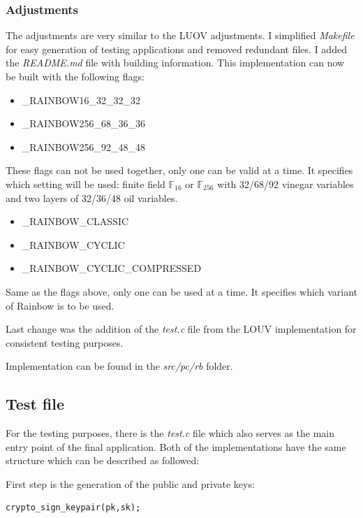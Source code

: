 \documentclass[thesis=M,english]{FITthesis}[2019/12/23]
\begin{document}
\subsubsection{Adjustments}
The adjustments are very similar to the LUOV adjustments. I simplified \textit{Makefile} for easy generation of testing applications and removed redundant files. I added the \textit{README.md} file with building information. This implementation can now be built with the following flags:

\begin{itemize}
\item	\_RAINBOW16\_32\_32\_32
\item	\_RAINBOW256\_68\_36\_36
\item	\_RAINBOW256\_92\_48\_48
\end{itemize}
These flags can not be used together, only one can be valid at a time. It specifies which setting will be used: finite field $\mathbb{F}_{16}$ or $\mathbb{F}_{256}$ with 32/68/92 vinegar variables and two layers of 32/36/48 oil variables.

\begin{itemize}
\item	\_RAINBOW\_CLASSIC
\item	\_RAINBOW\_CYCLIC
\item	\_RAINBOW\_CYCLIC\_COMPRESSED
\end{itemize}
Same as the flags above, only one can be used at a time. It specifies which variant of Rainbow is to be used.

\bigskip
\noindent
Last change was the addition of the \textit{test.c} file from the LOUV implementation for consistent testing purposes. 

\bigskip
\noindent
Implementation can be found in the \textit{src/pc/rb} folder.

\subsection{Test file}
For the testing purposes, there is the \textit{test.c} file which also serves as the main entry point of the final application. Both of the implementations have the same structure which can be described as followed:

\bigskip
\noindent
First step is the generation of the public and private keys:
\begin{lstlisting}[frame=single]
crypto_sign_keypair(pk,sk);
\end{lstlisting}
\end{document}

